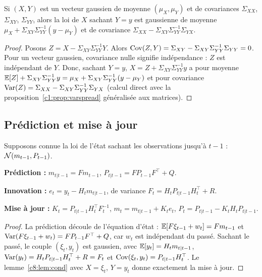 \begin{lemma}\label{c8:lem:cond}
Si $(X, Y)$ est un vecteur gaussien de moyenne $(\mu_X,\mu_Y)$ et de covariances $\Sigma_{XX}$, $\Sigma_{XY}$, $\Sigma_{YY}$, alors la loi de $X$ sachant $Y = y$ est gaussienne de moyenne $\mu_X + \Sigma_{XY}\Sigma_{YY}^{-1}(y-\mu_Y)$ et de covariance $\Sigma_{XX} - \Sigma_{XY}\Sigma_{YY}^{-1}\Sigma_{YX}$.
\end{lemma}
\begin{proof}
Posons $Z = X - \Sigma_{XY}\Sigma_{YY}^{-1}Y$. Alors $\operatorname{Cov}(Z, Y) = \Sigma_{XY} - \Sigma_{XY}\Sigma_{YY}^{-1}\Sigma_{YY} = 0$. Pour un vecteur gaussien, covariance nulle signifie indépendance : $Z$ est indépendant de $Y$. Donc, sachant $Y = y$, $X = Z + \Sigma_{XY}\Sigma_{YY}^{-1}y$ a pour moyenne $\mathbb{E}[Z] + \Sigma_{XY}\Sigma_{YY}^{-1}y = \mu_X + \Sigma_{XY}\Sigma_{YY}^{-1}(y - \mu_Y)$ et pour covariance $\operatorname{Var}(Z) = \Sigma_{XX} - \Sigma_{XY}\Sigma_{YY}^{-1}\Sigma_{YX}$ (calcul direct avec la proposition~\ref{c1:prop:varspread} généralisée aux matrices).
\end{proof}

\subsection{Prédiction et mise à jour}

Supposons connue la loi de l'état sachant les observations jusqu'à $t-1$ : $\mathcal{N}(m_{t-1}, P_{t-1})$.

\begin{proposition}\label{c8:prop:kalman}
\textbf{Prédiction :} $m_{t|t-1} = F m_{t-1}$, \quad $P_{t|t-1} = F P_{t-1}F^\top + Q$.

\textbf{Innovation :} $e_t = y_t - H_tm_{t|t-1}$, de variance $F_t = H_tP_{t|t-1}H_t^\top + R$.

\textbf{Mise à jour :} $K_t = P_{t|t-1}H_t^\top F_t^{-1}$, \quad $m_t = m_{t|t-1} + K_te_t$, \quad $P_t = P_{t|t-1} - K_tH_tP_{t|t-1}$.
\end{proposition}
\begin{proof}
La prédiction découle de l'équation d'état : $\mathbb{E}[F\xi_{t-1} + w_t] = Fm_{t-1}$ et $\operatorname{Var}(F\xi_{t-1} + w_t) = FP_{t-1}F^\top + Q$, car $w_t$ est indépendant du passé. Sachant le passé, le couple $(\xi_t, y_t)$ est gaussien, avec $\mathbb{E}[y_t] = H_tm_{t|t-1}$, $\operatorname{Var}(y_t) = H_tP_{t|t-1}H_t^\top + R = F_t$ et $\operatorname{Cov}(\xi_t, y_t) = P_{t|t-1}H_t^\top$. Le lemme~\ref{c8:lem:cond} avec $X = \xi_t$, $Y = y_t$ donne exactement la mise à jour.
\end{proof}

